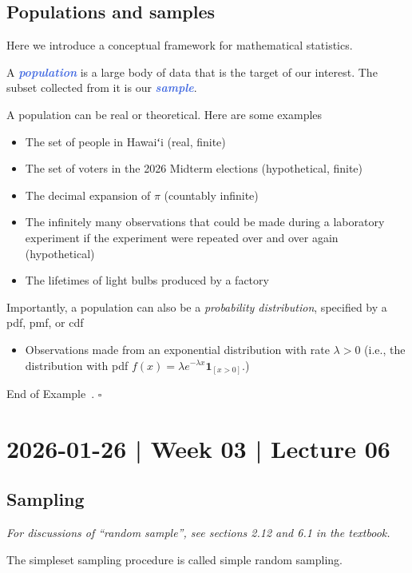 \documentclass[10pt]{article}
\newcommand{\okina}{{\OkinaFallback ʻ}} %
\theoremstyle{definition}
\newtheorem{example}[theorem]{Example}
\renewenvironment{example}
{\begin{oldexample}}
  {\par\smallskip\hfill   End of Example~\theexample. $\square$    \par\end{oldexample}}
\newcommand{\1}[1]{\textbf{1}_{\left[#1\right]}} %
\newcommand{\demph}[1]{\textcolor{RoyalBlue}{\textbf{\slshape #1}}} %
\begin{document}
\subsection{Populations and samples}


Here we introduce a conceptual framework for mathematical statistics.

A \demph{population} is a large body of data that is the target of our
interest. The subset collected from it is our \demph{sample}. 

\begin{example}[Populations]
  A population can be real or theoretical. Here are some examples
  \begin{itemize}
    \item The set of people in Hawai{\okina}i (real, finite)
    \item The set of voters in the 2026 Midterm elections (hypothetical, finite)
    \item The decimal expansion of $\pi$ (countably infinite)
    \item The infinitely many observations that could be made during a
    laboratory experiment if the experiment were repeated over and over again
    (hypothetical)
    \item The lifetimes of light bulbs produced by a factory
  \end{itemize}
  Importantly, a population can also be a \textit{probability distribution},
  specified by a pdf, pmf, or cdf
  \begin{itemize}
    \item Observations made from an exponential distribution with rate
    $\lambda>0$ (i.e., the distribution with pdf
    $f(x)=\lambda e^{-\lambda x}\mathbf{1}_{\left[ x>0 \right] }$.)
  \end{itemize}
\end{example}



\newpage
\section{2026-01-26 | Week 03 | Lecture 06}
\subsection{Sampling}
\textit{For discussions of ``random sample'', see sections 2.12 and 6.1 in the textbook.}

The simpleset sampling procedure is called simple random sampling.
\end{document}
